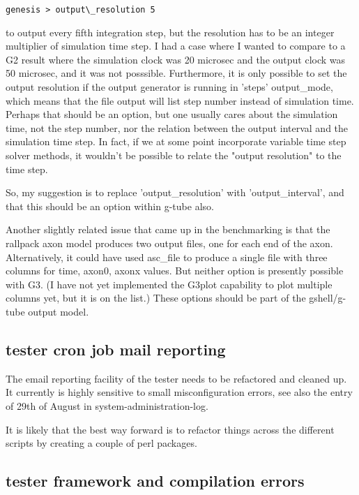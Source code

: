\documentclass[12pt]{article}
\begin{document}
\begin{verbatim}
genesis > output\_resolution 5
\end{verbatim}

to output every fifth integration step, but the resolution has to be
an integer multiplier of simulation time step. I had a case where I
wanted to compare to a G2 result where the simulation clock was 20
microsec and the output clock was 50 microsec, and it was not
posssible.  Furthermore, it is only possible to set the output
resolution if the output generator is running in 'steps' output\_mode,
which means that the file output will list step number instead of
simulation time.  Perhaps that should be an option, but one usually
cares about the simulation time, not the step number, nor the relation
between the output interval and the simulation time step. In fact, if
we at some point incorporate variable time step solver methods, it
wouldn't be possible to relate the "output resolution" to the time
step.

So, my suggestion is to replace 'output\_resolution' with
'output\_interval', and that this should be an option within g-tube
also.

Another slightly related issue that came up in the benchmarking is
that the rallpack axon model produces two output files, one for each
end of the axon.  Alternatively, it could have used asc\_file to
produce a single file with three columns for time, axon0, axonx
values.  But neither option is presently possible with G3.  (I have
not yet implemented the G3plot capability to plot multiple columns
yet, but it is on the list.)  These options should be part of the
gshell/g-tube output model.


\subsection{tester cron job mail reporting}

The email reporting facility of the tester needs to be refactored and
cleaned up.  It currently is highly sensitive to small
misconfiguration errors, see also the entry of 29th of August in
system-administration-log.

It is likely that the best way forward is to refactor things across
the different scripts by creating a couple of perl packages.


\subsection{tester framework and compilation errors}
\end{document}
